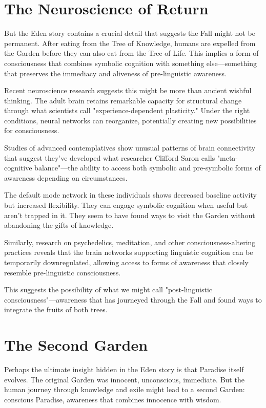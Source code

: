 \documentclass[10pt,twocolumn]{article}
\begin{document}
\section{The Neuroscience of Return}

But the Eden story contains a crucial detail that suggests the Fall might not be permanent. After eating from the Tree of Knowledge, humans are expelled from the Garden before they can also eat from the Tree of Life. This implies a form of consciousness that combines symbolic cognition with something else—something that preserves the immediacy and aliveness of pre-linguistic awareness.

Recent neuroscience research suggests this might be more than ancient wishful thinking. The adult brain retains remarkable capacity for structural change through what scientists call "experience-dependent plasticity." Under the right conditions, neural networks can reorganize, potentially creating new possibilities for consciousness.

Studies of advanced contemplatives show unusual patterns of brain connectivity that suggest they've developed what researcher Clifford Saron calls "meta-cognitive balance"—the ability to access both symbolic and pre-symbolic forms of awareness depending on circumstances.

The default mode network in these individuals shows decreased baseline activity but increased flexibility. They can engage symbolic cognition when useful but aren't trapped in it. They seem to have found ways to visit the Garden without abandoning the gifts of knowledge.

Similarly, research on psychedelics, meditation, and other consciousness-altering practices reveals that the brain networks supporting linguistic cognition can be temporarily downregulated, allowing access to forms of awareness that closely resemble pre-linguistic consciousness.

This suggests the possibility of what we might call "post-linguistic consciousness"—awareness that has journeyed through the Fall and found ways to integrate the fruits of both trees.

\section{The Second Garden}

Perhaps the ultimate insight hidden in the Eden story is that Paradise itself evolves. The original Garden was innocent, unconscious, immediate. But the human journey through knowledge and exile might lead to a second Garden: conscious Paradise, awareness that combines innocence with wisdom.
\end{document}
